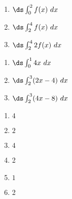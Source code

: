 {\noindent
\begin{minipage}{\linewidth}
\end{minipage}
\noindent\begin{minipage}[t]{.5\linewidth}
\begin{enumerate}
\item		$\ds \int_0^2 f(x)\ dx$
\item		$\ds \int_2^4 f(x)\ dx$
\item		$\ds \int_2^4 2f(x)\ dx$
\end{enumerate}
\end{minipage}
\begin{minipage}[t]{.5\linewidth}
\begin{enumerate}\addtocounter{enumii}{3}
\item		$\ds \int_0^1 4x\ dx$
\item		$\ds \int_2^3 (2x-4)\ dx$
\item		$\ds \int_2^3 (4x-8)\ dx$
\end{enumerate}
\end{minipage}
}
{\begin{enumerate}
\item		$4$
\item		$2$
\item		$4$
\item		2
\item		$1$
\item		2
\end{enumerate}
}

